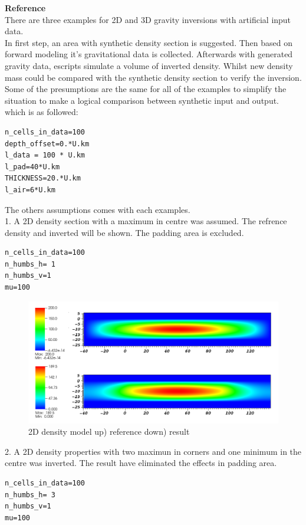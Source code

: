\textbf{Reference}\\

There are three examples for 2D and 3D gravity inversions with artificial input data.\\
In first step, an area with synthetic density section is suggested. Then based on forward modeling it's gravitational data is collected. Afterwards with generated gravity data, escripts simulate a volume of inverted density. Whilst new density mass could be compared with the synthetic density section to verify the inversion.\\

Some of the presumptions are the same for all of the examples to simplify the situation to make a logical comparison between synthetic input and output. which is as followed:\\
\begin{verbatim}
n_cells_in_data=100
depth_offset=0.*U.km
l_data = 100 * U.km
l_pad=40*U.km
THICKNESS=20.*U.km
l_air=6*U.km
\end{verbatim}
The others assumptions comes with each examples.\\

1.  A 2D density section with a maximum in centre was assumed. The refrence density and inverted will be shown. The padding area is excluded. \\
\begin{verbatim}
n_cells_in_data=100
n_humbs_h= 1
n_humbs_v=1
mu=100
\end{verbatim}

\begin{figure}
\centering
\includegraphics[width=\textwidth]{grav2D1.png}
\caption{2D density model up) reference  down) result}

\end{figure}

2. A 2D density properties with two maximun in corners and one minimum in the centre was inverted. The result have eliminated the effects in padding area. \\
\begin{verbatim}
n_cells_in_data=100
n_humbs_h= 3
n_humbs_v=1
mu=100
\end{verbatim}

